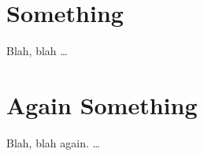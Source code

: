\chapter{Something}\label{sec:something}

Blah, blah \dots

 \cleardoublepage


\chapter{Again Something}\label{sec:again_something}

Blah, blah again. \dots

 \cleardoublepage
